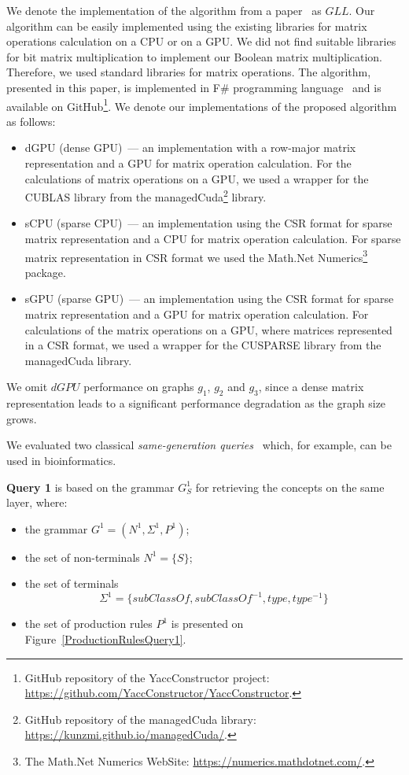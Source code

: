 We denote the implementation of the algorithm from a paper~\cite{GLL} as $GLL$. Our algorithm can be easily implemented using the existing libraries for matrix operations calculation on a CPU or on a GPU. We did not find suitable libraries for bit matrix multiplication to implement our Boolean matrix multiplication. Therefore, we used standard libraries for matrix operations. The algorithm, presented in this paper, is implemented in F\# programming language~\cite{fsharp} and is available on GitHub\footnote{GitHub repository of the YaccConstructor project: \url{https://github.com/YaccConstructor/YaccConstructor}.}. We denote our implementations of the proposed algorithm as follows:

\begin{itemize}
    \item dGPU (dense GPU)~--- an implementation with a row-major matrix representation and a GPU for matrix operation calculation. For the calculations of matrix operations on a GPU, we used a wrapper for the CUBLAS library from the managedCuda\footnote{GitHub repository of the managedCuda library: \url{https://kunzmi.github.io/managedCuda/}.} library.
    \item sCPU (sparse CPU)~--- an implementation using the CSR format for sparse matrix representation and a CPU for matrix operation calculation. For sparse matrix representation in CSR format we used the Math.Net Numerics\footnote{The Math.Net Numerics WebSite: \url{https://numerics.mathdotnet.com/}.} package.
    \item sGPU (sparse GPU)~--- an implementation using the CSR format for sparse matrix representation and a GPU for matrix operation calculation. For calculations of the matrix operations on a GPU, where matrices represented in a CSR format, we used a wrapper for the CUSPARSE library from the managedCuda library.
\end{itemize}

We omit $dGPU$ performance on graphs $g_1$, $g_2$ and $g_3$, since a dense matrix representation leads to a significant performance degradation as the graph size grows. 

We evaluated two classical \emph{same-generation queries}~\cite{FndDB} which, for example, can be used in bioinformatics.

\textbf{Query 1} is based on the grammar $G^1_S$ for retrieving the concepts on the same layer, where:
\begin{itemize}
    \item the grammar $G^1 = (N^1, \Sigma^1, P^1)$;
    \item the set of non-terminals $N^1 = \{S\}$;
    \item the set of terminals \[\Sigma^1 = \{subClassOf, subClassOf^{-1}, type, type^{-1}\}\]
    \item the set of production rules $P^1$ is presented on Figure~\ref{ProductionRulesQuery1}.
\end{itemize}

